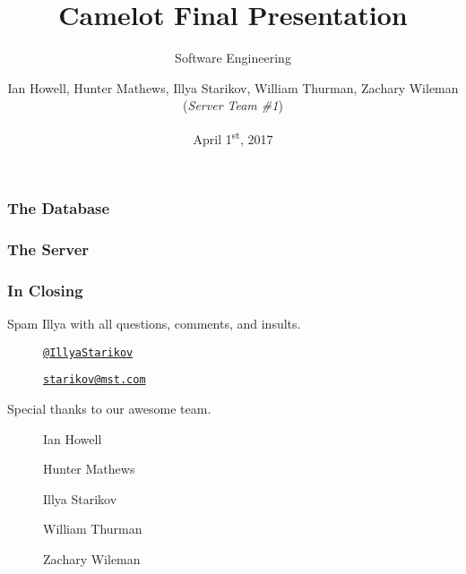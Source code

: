 \documentclass{beamer}
\title{Camelot Final Presentation}
\subtitle{Software Engineering}
\author{Ian Howell, Hunter Mathews, Illya Starikov, William Thurman, Zachary Wileman (\textit{Server Team \#1})}
\date{April 1\textsuperscript{st}, 2017}
\institute{Missouri University of Science and Technology}
\begin{document}
\begin{frame}
    \vfill
    \centering
\end{frame}

\begin{frame}
    \maketitle
\end{frame}

\begin{frame}
    \frametitle{The Database}
\end{frame}

\begin{frame}
    \frametitle{The Server}
\end{frame}


\begin{frame}
    \frametitle{In Closing}

    Spam Illya with all questions, comments, and insults.
    \begin{description}
        \item[\faGithub]  \href{https://github.com/IllyaStarikov}{\nolinkurl{@IllyaStarikov}}
        \item[\faComment] \href{mailto:starikov@mst.edu}{\nolinkurl{starikov@mst.com}}
    \end{description}

    Special thanks to our awesome team.
    \begin{description}
        \item[\faUser] Ian Howell
        \item[\faUser] Hunter Mathews
        \item[\faUser] Illya Starikov
        \item[\faUser] William Thurman
        \item[\faUser] Zachary Wileman
    \end{description}
\end{frame}
\end{document}
